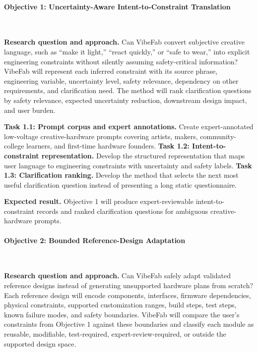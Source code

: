 \vspace{-10pt}
\paragraph{Objective 1: Uncertainty-Aware Intent-to-Constraint Translation}~{}

\textbf{Research question and approach.} Can VibeFab convert subjective creative language, such as ``make it light,'' ``react quickly,'' or ``safe to wear,'' into explicit engineering constraints without silently assuming safety-critical information? VibeFab will represent each inferred constraint with its source phrase, engineering variable, uncertainty level, safety relevance, dependency on other requirements, and clarification need. The method will rank clarification questions by safety relevance, expected uncertainty reduction, downstream design impact, and user burden.

\textbf{Task 1.1: Prompt corpus and expert annotations.} Create expert-annotated low-voltage creative-hardware prompts covering artists, makers, community-college learners, and first-time hardware founders.
\textbf{Task 1.2: Intent-to-constraint representation.} Develop the structured representation that maps user language to engineering constraints with uncertainty and safety labels.
\textbf{Task 1.3: Clarification ranking.} Develop the method that selects the next most useful clarification question instead of presenting a long static questionnaire.

\textbf{Expected result.} Objective 1 will produce expert-reviewable intent-to-constraint records and ranked clarification questions for ambiguous creative-hardware prompts.

\vspace{-10pt}
\paragraph{Objective 2: Bounded Reference-Design Adaptation}~{}

\textbf{Research question and approach.} Can VibeFab safely adapt validated reference designs instead of generating unsupported hardware plans from scratch? Each reference design will encode components, interfaces, firmware dependencies, physical constraints, supported customization ranges, build steps, test steps, known failure modes, and safety boundaries. VibeFab will compare the user's constraints from Objective 1 against these boundaries and classify each module as reusable, modifiable, test-required, expert-review-required, or outside the supported design space.

